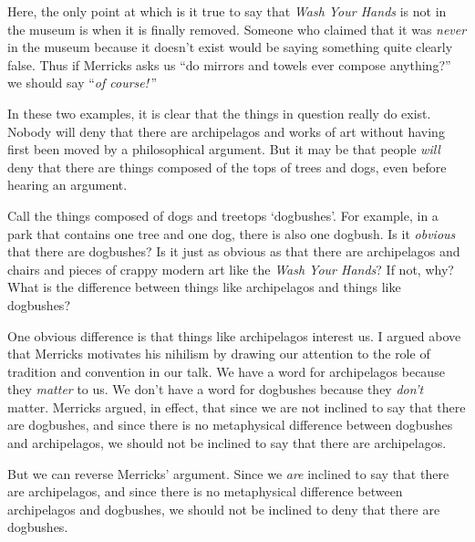 \documentclass[11pt]{article}
\begin{document}
\begin{spacing}{1.25}
Here, the only point at which is it true to say that {\em Wash Your
  Hands} is not in the museum is when it is finally removed.  Someone
who claimed that it was {\em never} in the museum because it doesn't
exist would be saying something quite clearly false.  Thus if Merricks
asks us ``do mirrors and towels ever compose anything?'' we should say
``{\em of course!}\,''

In these two examples, it is clear that the things in question really
do exist.  Nobody will deny that there are archipelagos and works of
art without having first been moved by a philosophical argument.  But
it may be that people {\em will} deny that there are things composed
of the tops of trees and dogs, even before hearing an argument.

Call the things composed of dogs and treetops `dogbushes'.  For
example, in a park that contains one tree and one dog, there is also
one dogbush.  Is it {\em obvious} that there are dogbushes?  Is it
just as obvious as that there are archipelagos and chairs and pieces
of crappy modern art like the {\em Wash Your Hands}?  If not, why?
What is the difference between things like archipelagos and things
like dogbushes?

One obvious difference is that things like archipelagos interest us.
I argued above that Merricks motivates his nihilism by drawing our
attention to the role of tradition and convention in our talk.  We
have a word for archipelagos because they {\em matter} to us.  We
don't have a word for dogbushes because they {\em don't} matter.
Merricks argued, in effect, that since we are not inclined to say that
there are dogbushes, and since there is no metaphysical difference
between dogbushes and archipelagos, we should not be inclined to say
that there are archipelagos.

But we can reverse Merricks' argument.  Since we {\em are} inclined to
say that there are archipelagos, and since there is no metaphysical
difference between archipelagos and dogbushes, we should not be
inclined to deny that there are dogbushes.



\end{spacing}
\end{document}
